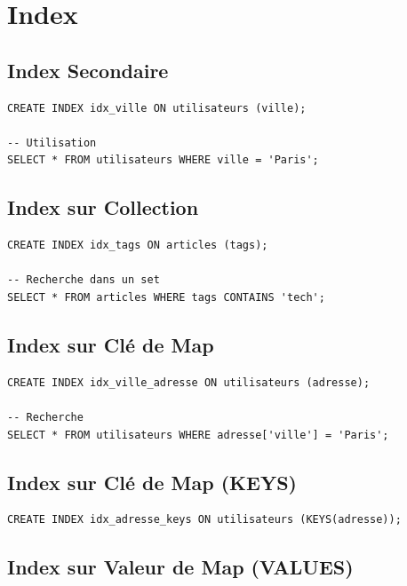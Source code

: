\documentclass[11pt,a4paper]{article}
\begin{document}
\newpage

\section{Index}

\subsection{Index Secondaire}

\begin{lstlisting}
CREATE INDEX idx_ville ON utilisateurs (ville);

-- Utilisation
SELECT * FROM utilisateurs WHERE ville = 'Paris';
\end{lstlisting}

\subsection{Index sur Collection}

\begin{lstlisting}
CREATE INDEX idx_tags ON articles (tags);

-- Recherche dans un set
SELECT * FROM articles WHERE tags CONTAINS 'tech';
\end{lstlisting}

\subsection{Index sur Clé de Map}

\begin{lstlisting}
CREATE INDEX idx_ville_adresse ON utilisateurs (adresse);

-- Recherche
SELECT * FROM utilisateurs WHERE adresse['ville'] = 'Paris';
\end{lstlisting}

\subsection{Index sur Clé de Map (KEYS)}

\begin{lstlisting}
CREATE INDEX idx_adresse_keys ON utilisateurs (KEYS(adresse));
\end{lstlisting}

\subsection{Index sur Valeur de Map (VALUES)}
\end{document}
